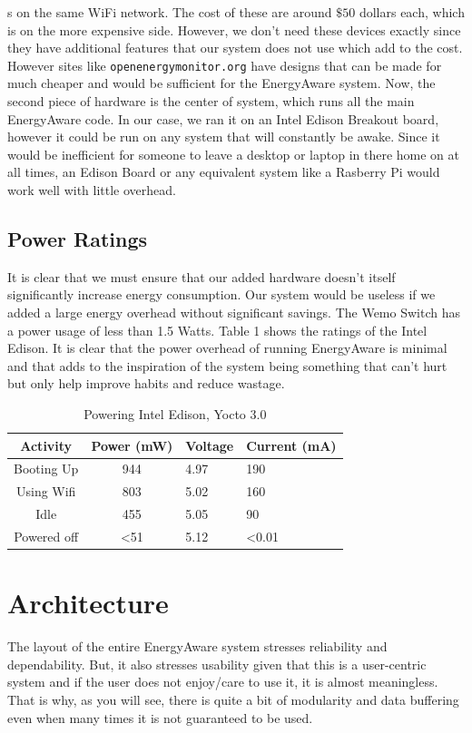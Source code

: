 \documentclass{sig-alternate-05-2015}
\begin{document}
s on the same WiFi network. The cost of these are around $\$50$ dollars each, which is on the more expensive side. However, we don't need these devices exactly since they have additional features that our system does not use which add to the cost. However sites like \texttt{openenergymonitor.org} have designs that can be made for much cheaper and would be sufficient for the EnergyAware system. Now, the second piece of hardware is the center of system, which runs all the main EnergyAware code. In our case, we ran it on an Intel Edison Breakout board, however it could be run on any system that will constantly be awake. Since it would be inefficient for someone to leave a desktop or laptop in there home on at all times, an Edison Board or any equivalent system like a Rasberry Pi would work well with little overhead.

\subsection{Power Ratings}
It is clear that we must ensure that our added hardware doesn't itself significantly increase energy consumption. Our system would be useless if we added a large energy overhead without significant savings. The Wemo Switch has a power usage of less than 1.5 Watts. Table 1 shows the ratings of the Intel Edison. It is clear that the power overhead of running EnergyAware is minimal and that adds to the inspiration of the system being something that can't hurt but only help improve habits and reduce wastage.

\begin{table}
	\centering
	\caption{Powering Intel Edison, Yocto 3.0}
	\begin{tabular}{|c|c|l|l|} \hline
		Activity&Power (mW)&Voltage&Current (mA)\\ \hline
		Booting Up& 944&4.97&190\\ \hline
		Using Wifi&803&5.02&160\\ \hline
		Idle&455&5.05&90\\ \hline
		Powered off&<51&5.12&<0.01\\
		\hline\end{tabular}
\end{table}


\section{Architecture}

The layout of the entire EnergyAware system stresses reliability and dependability. But, it also stresses usability given that this is a user-centric system and if the user does not enjoy/care to use it, it is almost meaningless. That is why, as you will see, there is quite a bit of modularity and data buffering even when many times it is not guaranteed to be used.
\end{document}
